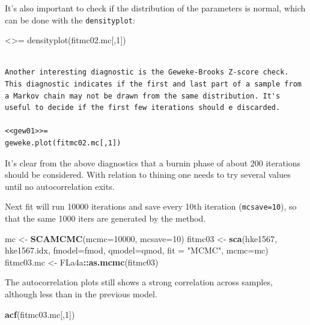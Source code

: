 \documentclass[
]{book}
\newenvironment{Shaded}{\begin{snugshade}}{\end{snugshade}}
\newcommand{\AttributeTok}[1]{\textcolor[rgb]{0.13,0.29,0.53}{#1}}
\newcommand{\DecValTok}[1]{\textcolor[rgb]{0.00,0.00,0.81}{#1}}
\newcommand{\FunctionTok}[1]{\textcolor[rgb]{0.13,0.29,0.53}{\textbf{#1}}}
\newcommand{\NormalTok}[1]{#1}
\newcommand{\OtherTok}[1]{\textcolor[rgb]{0.56,0.35,0.01}{#1}}
\newcommand{\SpecialCharTok}[1]{\textcolor[rgb]{0.81,0.36,0.00}{\textbf{#1}}}
\newcommand{\StringTok}[1]{\textcolor[rgb]{0.31,0.60,0.02}{#1}}
\begin{document}
It's also important to check if the distribution of the parameters is normal, which can be done with the \texttt{densityplot}:

\textless{}\textgreater=
densityplot(fitmc02.mc{[},1{]})

\begin{verbatim}

Another interesting diagnostic is the Geweke-Brooks Z-score check. This diagnostic indicates if the first and last part of a sample from a Markov chain may not be drawn from the same distribution. It's useful to decide if the first few iterations should e discarded.

<<gew01>>=
geweke.plot(fitmc02.mc[,1])
\end{verbatim}

It's clear from the above diagnostics that a burnin phase of about 200 iterations should be considered. With relation to thining one needs to try several values until no autocorrelation exits.

Next fit will run 10000 iterations and save every 10th iteration (\texttt{mcsave=10}), so that the same 1000 iters are generated by the method.

\begin{Shaded}
\begin{Highlighting}[]
\NormalTok{mc }\OtherTok{\textless{}{-}} \FunctionTok{SCAMCMC}\NormalTok{(}\AttributeTok{mcmc=}\DecValTok{10000}\NormalTok{, }\AttributeTok{mcsave=}\DecValTok{10}\NormalTok{)}
\NormalTok{fitmc03 }\OtherTok{\textless{}{-}} \FunctionTok{sca}\NormalTok{(hke1567, hke1567.idx, }\AttributeTok{fmodel=}\NormalTok{fmod, }\AttributeTok{qmodel=}\NormalTok{qmod, }\AttributeTok{fit =} \StringTok{"MCMC"}\NormalTok{, }\AttributeTok{mcmc=}\NormalTok{mc)}
\NormalTok{fitmc03.mc }\OtherTok{\textless{}{-}}\NormalTok{ FLa4a}\SpecialCharTok{::}\FunctionTok{as.mcmc}\NormalTok{(fitmc03)}
\end{Highlighting}
\end{Shaded}

The autocorrelation plots still shows a strong correlation across samples, although less than in the previous model.

\begin{Shaded}
\begin{Highlighting}[]
\FunctionTok{acf}\NormalTok{(fitmc03.mc[,}\DecValTok{1}\NormalTok{])}
\end{Highlighting}
\end{Shaded}
\end{document}
